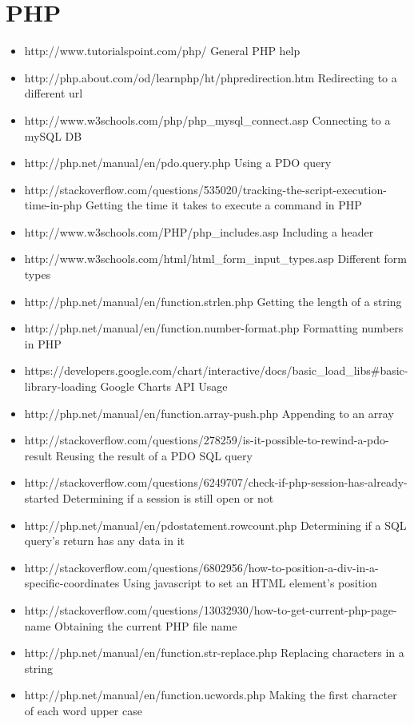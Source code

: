 \documentclass[12pt]{article}
\begin{document}
\section{PHP}
	\begin{itemize}
		\item http://www.tutorialspoint.com/php/
		\subitem General PHP help
		\item http://php.about.com/od/learnphp/ht/phpredirection.htm
		\subitem Redirecting to a different url
		\item http://www.w3schools.com/php/php\_mysql\_connect.asp
		\subitem Connecting to a mySQL DB
		\item http://php.net/manual/en/pdo.query.php
		\subitem Using a PDO query
		\item http://stackoverflow.com/questions/535020/tracking-the-script-execution-time-in-php
		\subitem Getting the time it takes to execute a command in PHP
		\item http://www.w3schools.com/PHP/php\_includes.asp
		\subitem Including a header
		\item http://www.w3schools.com/html/html\_form\_input\_types.asp
		\subitem Different form types
		\item http://php.net/manual/en/function.strlen.php
		\subitem Getting the length of a string
		\item http://php.net/manual/en/function.number-format.php
		\subitem Formatting numbers in PHP
		\item https://developers.google.com/chart/interactive/docs/basic_load_libs#basic-library-loading
		\subitem Google Charts API Usage
		\item http://php.net/manual/en/function.array-push.php
		\subitem Appending to an array
		\item http://stackoverflow.com/questions/278259/is-it-possible-to-rewind-a-pdo-result
		\subitem Reusing the result of a PDO SQL query
		\item http://stackoverflow.com/questions/6249707/check-if-php-session-has-already-started
		\subitem Determining if a session is still open or not
		\item http://php.net/manual/en/pdostatement.rowcount.php
		\subitem Determining if a SQL query's return has any data in it
		\item http://stackoverflow.com/questions/6802956/how-to-position-a-div-in-a-specific-coordinates
		\subitem Using javascript to set an HTML element's position
		\item http://stackoverflow.com/questions/13032930/how-to-get-current-php-page-name
		\subitem Obtaining the current PHP file name
		\item http://php.net/manual/en/function.str-replace.php
		\subitem Replacing characters in a string
		\item http://php.net/manual/en/function.ucwords.php
		\subitem Making the first character of each word upper case
	\end{itemize}
\end{document}
